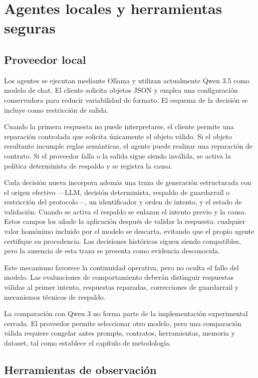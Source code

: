 \section{Agentes locales y herramientas seguras}

\subsection{Proveedor local}

Los agentes se ejecutan mediante Ollama y utilizan actualmente Qwen 3.5 como
modelo de chat. El cliente solicita objetos JSON y emplea una configuración
conservadora para reducir variabilidad de formato. El esquema de la decisión se
incluye como restricción de salida.

Cuando la primera respuesta no puede interpretarse, el cliente permite una
reparación controlada que solicita únicamente el objeto válido. Si el objeto
resultante incumple reglas semánticas, el agente puede realizar una reparación
de contrato. Si el proveedor falla o la salida sigue siendo inválida, se activa
la política determinista de respaldo y se registra la causa.

Cada decisión nueva incorpora además una traza de generación estructurada con
el origen efectivo ---LLM, decisión determinista, respaldo de guardarraíl o
restricción del protocolo---, un identificador y orden de intento, y el estado
de validación. Cuando se activa el respaldo se enlazan el intento previo y la causa.
Estos campos los añade la aplicación después de validar la respuesta: cualquier
valor homónimo incluido por el modelo se descarta, evitando que el propio agente
certifique su procedencia. Las decisiones históricas siguen siendo compatibles,
pero la ausencia de esta traza se presenta como evidencia desconocida.

Este mecanismo favorece la continuidad operativa, pero no oculta el fallo del
modelo. Las evaluaciones de comportamiento deberán distinguir respuestas
válidas al primer intento, respuestas reparadas, correcciones de guardarrail y
mecanismos técnicos de respaldo.

La comparación con Qwen 3 no forma parte de la implementación experimental
cerrada. El proveedor permite seleccionar otro modelo, pero una comparación
válida requiere congelar antes prompts, contratos, herramientas, memoria y
dataset, tal como establece el capítulo de metodología.

\subsection{Herramientas de observación}

